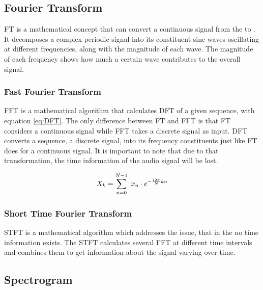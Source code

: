\subsection{Fourier Transform}
\label{sub:Fourier-Transform}

\gls{FT} is a mathematical concept that can convert a continuous signal from the  to . It decomposes a complex periodic signal into its constituent sine waves oscillating at different frequencies, along with the magnitude of each wave. The magnitude of each frequency shows how much a certain wave contributes to the overall signal.

\subsubsection{Fast Fourier Transform}
\label{subsub:Fast-Fourier-Transform}

\gls{FFT} is a mathematical algorithm that calculates \gls{DFT} of a given sequence, with equation \ref{eq:DFT}. The only difference between \gls{FT} and \gls{FFT} is that \gls{FT} considers a continuous signal while \gls{FFT} takes a discrete signal as input. \gls{DFT} converts a sequence, a discrete signal, into its frequency constituents just like \gls{FT} does for a continuous signal. It is important to note that due to that transformation, the time information of the audio signal will be lost.

\begin{equation}
    \centering
    X_k = \sum_{n=0}^{N-1} \ x_n \cdot e^{-\frac{i2\pi}{N}kn}
    \label{eq:DFT}
\end{equation}

\subsubsection{Short Time Fourier Transform}
\label{subsub:Short-Time-Fourier-Transform}

\gls{STFT} is a mathematical algorithm which addresses the issue, that in the  no time information exists. The \gls{STFT} calculates several \gls{FFT} at different time intervals and combines them to get information about the signal varying over time.

\subsection{Spectrogram}
\label{sub:Spectrogram}

